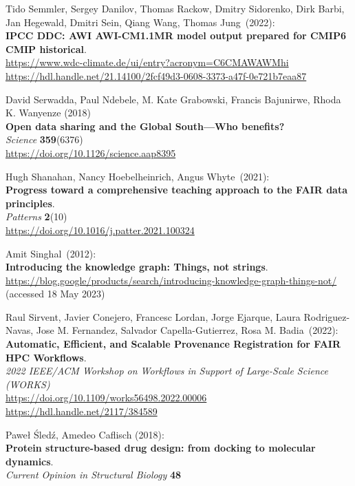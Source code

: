 \begin{thebibliography}{9}
Tido Semmler, Sergey Danilov, Thomas Rackow, Dmitry Sidorenko, Dirk Barbi, Jan Hegewald, Dmitri Sein, Qiang Wang, Thomas Jung~(2022): \\
\textbf{IPCC DDC: AWI AWI-CM1.1MR model output prepared for CMIP6 CMIP historical}. \\
\url{https://www.wdc-climate.de/ui/entry?acronym=C6CMAWAWMhi}\\
\url{https://hdl.handle.net/21.14100/2fcf49d3-0608-3373-a47f-0e721b7eaa87}

David Serwadda, Paul Ndebele, M. Kate Grabowski, Francis Bajunirwe, Rhoda K. Wanyenze (2018) \\
\textbf{Open data sharing and the Global South—Who benefits?} \\
\emph{Science} \textbf{359}(6376) \\
\url{https://doi.org/10.1126/science.aap8395}

Hugh Shanahan, Nancy Hoebelheinrich, Angus Whyte~(2021):\\
\textbf{Progress toward a comprehensive teaching approach to the FAIR data principles}.\\
\emph{Patterns} \textbf{2}(10) \\
\url{https://doi.org/10.1016/j.patter.2021.100324}

Amit Singhal~(2012): \\
\textbf{Introducing the knowledge graph: Things, not strings}.\\
\url{https://blog.google/products/search/introducing-knowledge-graph-things-not/}
(accessed 18 May 2023)

Raul Sirvent, Javier Conejero, Francesc Lordan, Jorge Ejarque, Laura Rodriguez-Navas, Jose M. Fernandez, Salvador Capella-Gutierrez, Rosa M. Badia~(2022): \\
\textbf{Automatic, Efficient, and Scalable Provenance Registration for FAIR HPC Workflows}.\\
\emph{2022 IEEE/ACM Workshop on Workflows in Support of Large-Scale Science (WORKS)}\\
\url{https://doi.org/10.1109/works56498.2022.00006}\\
\url{https://hdl.handle.net/2117/384589}

Paweł Śledź, Amedeo Caflisch (2018):\\
\textbf{Protein structure-based drug design: from docking to molecular dynamics}.\\
\emph{Current Opinion in Structural Biology} \textbf{48} \\


\end{thebibliography}
